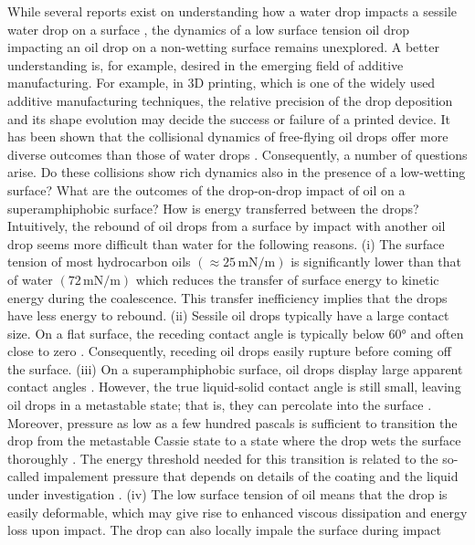 While several reports exist on understanding how a water drop impacts a sessile water drop on a surface \cite{damak2018, graham2012, farhangi2012, castrejon-pita2013, sykes2020surface}, the dynamics of a low surface tension oil drop impacting an oil drop on a non-wetting surface remains unexplored. A better understanding is, for example, desired in the emerging field of additive manufacturing. For example, in 3D printing, which is one of the widely used additive manufacturing techniques, the relative precision of the drop deposition and its shape evolution may decide the success or failure of a printed device. It has been shown that the collisional dynamics of free-flying oil drops offer more diverse outcomes than those of water drops \citep{jiang1992, qian1997}. Consequently, a number of questions arise. Do these collisions show rich dynamics also in the presence of a low-wetting surface? What are the outcomes of the drop-on-drop impact of oil on a superamphiphobic surface? How is energy transferred between the drops? Intuitively, the rebound of oil drops from a surface by impact with another oil drop seems more difficult than water for the following reasons. (i) The surface tension  of most hydrocarbon oils $\left(\approx 25\,\si{\milli\newton}/\si{\meter}\right)$ is significantly lower than that of water $\left(72\,\si{\milli\newton}/\si{\meter}\right)$ which reduces the transfer of surface energy to kinetic energy during the coalescence. This transfer inefficiency implies that the drops have less energy to rebound. (ii) Sessile oil drops typically have a large contact size. On a flat surface, the receding contact angle is typically below $60\si{\degree}$ and often close to zero \cite{tavana2005}. Consequently, receding oil drops easily rupture before coming off the surface. (iii) On a superamphiphobic surface, oil drops display large apparent contact angles \cite{tuteja2007, pan2018}. However, the true liquid-solid contact angle is still small, leaving oil drops in a metastable state; that is, they can percolate into the surface \cite{papadopoulos2016}. Moreover, pressure as low as a few hundred pascals is sufficient to transition the drop from the metastable Cassie state to a state where the drop wets the surface thoroughly \cite{tuteja2007, butt2013}. The energy threshold needed for this transition is related to the so-called impalement pressure that depends on details of the coating and the liquid under investigation \cite{papadopoulos2016}. (iv) The low surface tension of oil means that the drop is easily deformable, which may give rise to enhanced viscous dissipation and energy loss upon impact. The drop can also locally impale the surface during impact \cite{deng2013, moevius2014}

